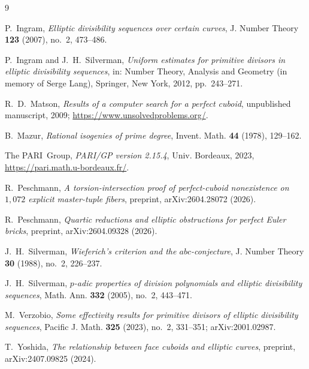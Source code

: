 \documentclass[11pt,reqno]{amsart}
\theoremstyle{plain}
\theoremstyle{definition}
\begin{document}
\begin{thebibliography}{9}

P.~Ingram,
\emph{Elliptic divisibility sequences over certain curves},
J. Number Theory \textbf{123} (2007), no.~2, 473--486.

P.~Ingram and J.~H.~Silverman,
\emph{Uniform estimates for primitive divisors in elliptic divisibility
sequences},
in: Number Theory, Analysis and Geometry (in memory of Serge Lang),
Springer, New York, 2012, pp.~243--271.

R.~D.~Matson,
\emph{Results of a computer search for a perfect cuboid},
unpublished manuscript, 2009;
\url{https://www.unsolvedproblems.org/}.

B.~Mazur,
\emph{Rational isogenies of prime degree},
Invent. Math. \textbf{44} (1978), 129--162.

The PARI~Group,
\emph{PARI/GP version 2.15.4},
Univ. Bordeaux, 2023,
\url{https://pari.math.u-bordeaux.fr/}.

R.~Peschmann,
\emph{A torsion-intersection proof of perfect-cuboid nonexistence on $1{,}072$
explicit master-tuple fibers},
preprint, arXiv:2604.28072 (2026).

R.~Peschmann,
\emph{Quartic reductions and elliptic obstructions for perfect Euler bricks},
preprint, arXiv:2604.09328 (2026).

J.~H.~Silverman,
\emph{Wieferich's criterion and the $abc$-conjecture},
J. Number Theory \textbf{30} (1988), no.~2, 226--237.

J.~H.~Silverman,
\emph{$p$-adic properties of division polynomials and elliptic divisibility
sequences},
Math. Ann. \textbf{332} (2005), no.~2, 443--471.

M.~Verzobio,
\emph{Some effectivity results for primitive divisors of elliptic divisibility
sequences},
Pacific J. Math. \textbf{325} (2023), no.~2, 331--351; arXiv:2001.02987.

T.~Yoshida,
\emph{The relationship between face cuboids and elliptic curves},
preprint, arXiv:2407.09825 (2024).

\end{thebibliography}
\end{document}
